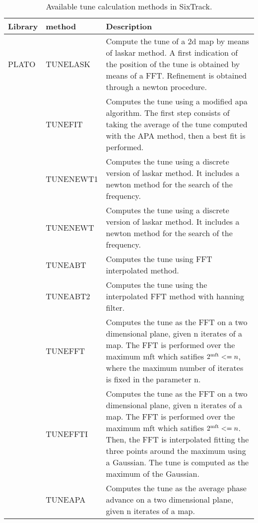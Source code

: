 \documentclass[a4paper,11pt]{report}
\begin{document}
\begin{table}[H]
	\begin{center}
		\caption{Available tune calculation methods in SixTrack.}
		\label{fma:tab:1}
		\begin{tabularx}{\textwidth}{|l|l|X|}
			\hline
\textbf{Library} & \textbf{method} & \textbf{Description} \\\hline
PLATO \cite{plato1,plato2}
& TUNELASK &	Compute the tune of a 2d map by means of laskar method. A first indication of the position of the tune is obtained by means of a FFT. Refinement is obtained through a newton procedure.\\\cline{2-3}
& TUNEFIT &	Computes the tune using a modified apa algorithm. The first step consists of taking the average of the tune computed with the APA method, then a best fit is performed.\\\cline{2-3}
& TUNENEWT1 &	Computes the tune using a discrete version of laskar method. It includes a newton method for the search of the frequency.\\\cline{2-3}
& TUNENEWT &	Computes the tune using a discrete version of laskar method. It includes a newton method for the search of the frequency.\\\cline{2-3}
& TUNEABT &	Computes the tune using FFT interpolated method.\\\cline{2-3}
& TUNEABT2 &	Computes the tune using the interpolated FFT method with hanning filter.\\\cline{2-3}
& TUNEFFT &	Computes the tune as the FFT on a two dimensional plane, given n iterates of a map. The FFT is performed over the maximum mft which satifies $2^{\rm mft} <= n$, where the maximum number of iterates is fixed in the parameter n.\\\cline{2-3}
& TUNEFFTI &	Computes the tune as the FFT on a two dimensional plane, given n iterates of a map. The FFT is performed over the maximum mft which satifies $2^{\rm mft} <= n$. Then, the FFT is interpolated fitting the three points around the maximum using a Gaussian. The tune is computed as the maximum of the Gaussian.\\\cline{2-3}
& TUNEAPA &	Computes the tune as the average phase advance on a two dimensional plane, given n iterates of a map. \\\hline
	\end{tabularx}
\end{center}
\end{table}
\end{document}
